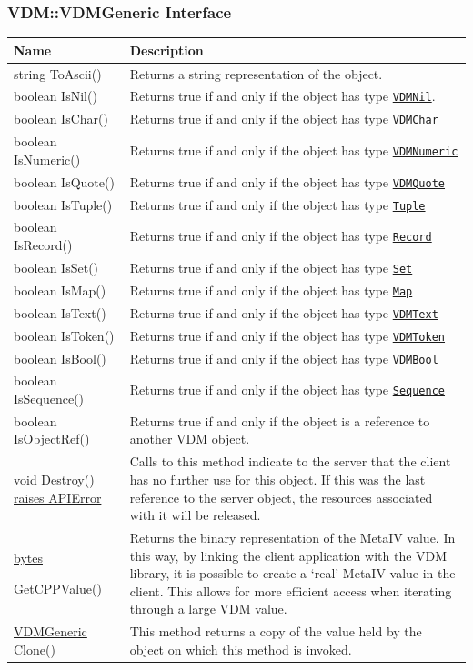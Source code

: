 \documentclass[\pformat,12pt]{article}
\newcommand{\pbs}[1]{\let\temp=\\#1\let\\=\temp}
\newenvironment{interfacetable}{%
  \begin{longtable}{|>{\pbs\raggedright\ttfamily}p{6.6cm}%
                    |>{\pbs\raggedright}p{6.6cm}|} \hline
  \textrm{\bfseries Name} &  \textbf{Description} \\ \hline
  \endhead
  }{\end{longtable}}
\newcommand{\APIError}{\hyperlink{exception.APIError}{raises APIError}}
\newcommand{\VDMGeneric}{\hyperlink{interface.Generic}{VDMGeneric}}
\newcommand{\bytes}{\hyperlink{type.bytes}{bytes}}
\newcommand{\VDMBool}{\hyperlink{interface.VDMBool}{VDMBool}}
\newcommand{\VDMChar}{\hyperlink{interface.VDMChar}{VDMChar}}
\newcommand{\VDMNumeric}{\hyperlink{interface.VDMNumeric}{VDMNumeric}}
\newcommand{\VDMQuote}{\hyperlink{interface.VDMQuote}{VDMQuote}}
\newcommand{\VDMText}{\hyperlink{interface.VDMText}{VDMText}}
\newcommand{\VDMToken}{\hyperlink{interface.VDMToken}{VDMToken}}
\newcommand{\VDMNil}{\hyperlink{interface.VDMNil}{VDMNil}}
\newcommand{\Map}{\hyperlink{interface.VDMMap}{Map}}
\newcommand{\Record}{\hyperlink{interface.VDMRecord}{Record}}
\newcommand{\Sequence}{\hyperlink{interface.VDMSequence}{Sequence}}
\newcommand{\Set}{\hyperlink{interface.VDMSet}{Set}}
\newcommand{\Tuple}{\hyperlink{interface.VDMTuple}{Tuple}}
\begin{document}
\subsubsection{VDM::VDMGeneric Interface}
\mbox{}

\begin{interfacetable}
string ToAscii()
  & Returns a string representation of the object.
\\ \hline
boolean IsNil()
  & Returns true if and only if the object has type \texttt{\VDMNil}.
\\ \hline
boolean IsChar()
  & Returns true if and only if the object has type \texttt{\VDMChar}
\\ \hline
boolean IsNumeric()
  & Returns true if and only if the object has type \texttt{\VDMNumeric}
\\ \hline
boolean IsQuote()
  & Returns true if and only if the object has type \texttt{\VDMQuote}
\\ \hline
boolean IsTuple()
  & Returns true if and only if the object has type \texttt{\Tuple}
\\ \hline
boolean IsRecord()
  & Returns true if and only if the object has type \texttt{\Record}
\\ \hline
boolean IsSet()
  & Returns true if and only if the object has type \texttt{\Set}
\\ \hline
boolean IsMap()
  & Returns true if and only if the object has type \texttt{\Map}
\\ \hline
boolean IsText()
  & Returns true if and only if the object has type \texttt{\VDMText}
\\ \hline
boolean IsToken()
  & Returns true if and only if the object has type \texttt{\VDMToken}
\\ \hline
boolean IsBool()
  & Returns true if and only if the object has type \texttt{\VDMBool}
\\ \hline
boolean IsSequence()
  & Returns true if and only if the object has type \texttt{\Sequence}
\\ \hline
boolean IsObjectRef()
  & Returns true if and only if the object is a reference to
    another VDM object.
\\ \hline
void Destroy() \APIError
  & Calls to this method indicate to the server that the client has
    no further use for this object. If this was the last reference to
    the server object, the resources associated with it will be
    released. 
\\ \hline
{\bytes} \hyperdef{method}{VDMGenericGetCPPValue}
GetCPPValue()
  &  Returns the binary representation of the MetaIV value. In
     this way, by linking the client application with the
     VDM library, it is possible to create a `real' MetaIV value
     in the client. This allows for more efficient access when
     iterating through a large VDM value.
\\ \hline
{\VDMGeneric} Clone()
  & This method returns a copy of the value held by the object
    on which this method is invoked.
\\ \hline
\end{interfacetable}
\end{document}

